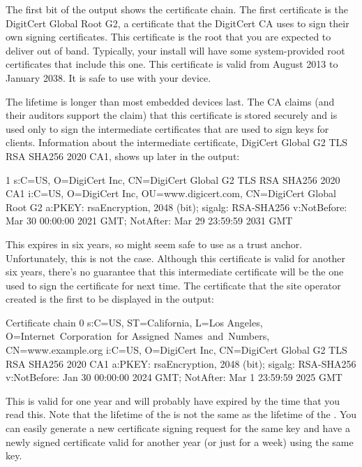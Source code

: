 The first bit of the output shows the certificate chain.
The first certificate is the DigitCert Global Root G2, a certificate that the DigitCert CA uses to sign their own signing certificates.
This certificate is the root that you are expected to deliver out of band.
Typically, your  install will have some system-provided root certificates that include this one.
This certificate is valid from August 2013 to January 2038.
It is  safe to use with your device.

The lifetime is longer than most embedded devices last.
The CA claims (and their auditors support the claim) that this certificate is stored securely and is used only to sign the intermediate certificates that are used to sign keys for clients.
Information about the intermediate certificate, DigiCert Global G2 TLS RSA SHA256 2020 CA1, shows up later in the output:

\begin{console}
 1 s:C=US, O=DigiCert Inc, CN=DigiCert Global G2 TLS RSA SHA256 2020 CA1
   i:C=US, O=DigiCert Inc, OU=www.digicert.com, CN=DigiCert Global Root G2
   a:PKEY: rsaEncryption, 2048 (bit); sigalg: RSA-SHA256
   v:NotBefore: Mar 30 00:00:00 2021 GMT; NotAfter: Mar 29 23:59:59 2031 GMT
\end{console}

This expires in six years, so might seem safe to use as a trust anchor.
Unfortunately, this is not the case.
Although this certificate is valid for another six years, there's no guarantee that this intermediate certificate will be the one used to sign the certificate for  next time.
The certificate that the site operator created is the first to be displayed in the output:

\begin{console}
Certificate chain
 0 s:C=US, ST=California, L=Los Angeles, O=Internet Corporation for
        Assigned Names and Numbers, CN=www.example.org
   i:C=US, O=DigiCert Inc, CN=DigiCert Global G2 TLS RSA SHA256 2020 CA1
   a:PKEY: rsaEncryption, 2048 (bit); sigalg: RSA-SHA256
   v:NotBefore: Jan 30 00:00:00 2024 GMT; NotAfter: Mar  1 23:59:59 2025 GMT
\end{console}

This is valid for one year and will probably have expired by the time that you read this.
Note that the lifetime of the  is not the same as the lifetime of the .
You can easily generate a new certificate signing request for the same key and have a newly signed certificate valid for another year (or just for a week) using the same key.

